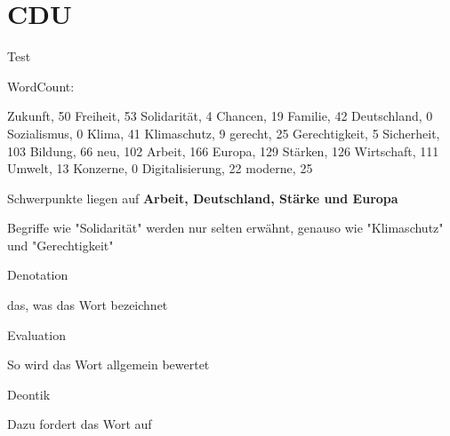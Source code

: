 \section{CDU}

Test

WordCount:

\startplacetable[location={here},title={}]
\bTABLE[offset=2mm]
\startCSV
Zukunft, 50
Freiheit, 53
Solidarität, 4
Chancen, 19
Familie, 42
Deutschland, 0
Sozialismus, 0
Klima, 41
Klimaschutz, 9
gerecht, 25
Gerechtigkeit, 5
Sicherheit, 103
Bildung, 66
neu, 102
Arbeit, 166
Europa, 129 
Stärken, 126
Wirtschaft, 111
Umwelt, 13
Konzerne, 0
Digitalisierung, 22
moderne, 25
\stopCSV
\eTABLE
\stopplacetable

\startplacefigure[location={here,force}]
\stopplacefigure

\page

Schwerpunkte liegen auf {\bf Arbeit, Deutschland, Stärke und Europa}


Begriffe wie "Solidarität" werden nur selten erwähnt, genauso wie "Klimaschutz" und "Gerechtigkeit"

\startitemize[packed]
\item Denotation
\startitemize[packed]
\item das, was das Wort bezeichnet
\stopitemize
\item Evaluation
\startitemize[packed]
\item So wird das Wort allgemein bewertet
\stopitemize
\item Deontik
\startitemize[packed]
\item Dazu fordert das Wort auf
\stopitemize
\stopitemize
